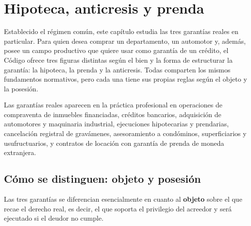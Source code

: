 \documentclass[12pt,oneside]{book}
\begin{document}
\chapter{Hipoteca, anticresis y prenda}\label{cap:hip-prenda-antic}

Establecido el régimen común, este capítulo estudia las tres garantías reales en particular. Para quien desea comprar un departamento, un automotor y, además, posee un campo productivo que quiere usar como garantía de un crédito, el Código ofrece tres figuras distintas según el bien y la forma de estructurar la garantía: la hipoteca, la prenda y la anticresis. Todas comparten los mismos fundamentos normativos, pero cada una tiene sus propias reglas según el objeto y la posesión.

Las garantías reales aparecen en la práctica profesional en operaciones de compraventa de inmuebles financiadas, créditos bancarios, adquisición de automotores y maquinaria industrial, ejecuciones hipotecarias y prendarias, cancelación registral de gravámenes, asesoramiento a condóminos, superficiarios y usufructuarios, y contratos de locación con garantía de prenda de moneda extranjera.

\section{Cómo se distinguen: objeto y posesión}

Las tres garantías se diferencian esencialmente en cuanto al \textbf{objeto} sobre el que recae el derecho real, es decir, el que soporta el privilegio del acreedor y será ejecutado si el deudor no cumple.
\end{document}
